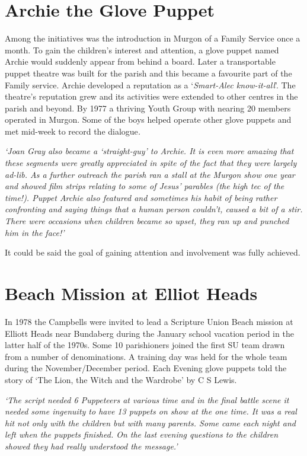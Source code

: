 \hypertarget{archie-the-glove-puppet}{%
\section{Archie the Glove Puppet}\label{archie-the-glove-puppet}}

Among the initiatives was the introduction in Murgon of a Family Service once a month. To gain the children's interest and attention, a glove puppet named Archie would suddenly appear from behind a board. Later a transportable puppet theatre was built for the parish and this became a favourite part of the Family service. Archie developed a reputation as a `\emph{Smart-Alec know-it-all}'. The theatre's reputation grew and its activities were extended to other centres in the parish and beyond. By 1977 a thriving Youth Group with nearing 20 members operated in Murgon. Some of the boys helped operate other glove puppets and met mid-week to record the dialogue\emph{.}

\emph{`Joan Gray also became a `straight-guy' to Archie. It is even more amazing that these segments were greatly appreciated in spite of the fact that they were largely ad-lib. As a further outreach the parish ran a stall at the Murgon show one year and showed film strips relating to some of Jesus' parables (the high tec of the time!). Puppet Archie also featured and sometimes his habit of being rather confronting and saying things that a human person couldn't, caused a bit of a stir. There were occasions when children became so upset, they ran up and punched him in the face!'}

It could be said the goal of gaining attention and involvement was fully achieved.

\hypertarget{beach-mission-at-elliot-heads}{%
\section{Beach Mission at Elliot Heads}\label{beach-mission-at-elliot-heads}}

In 1978 the Campbells were invited to lead a Scripture Union Beach mission at Elliott Heads near Bundaberg during the January school vacation period in the latter half of the 1970s. Some 10 parishioners joined the first SU team drawn from a number of denominations. A training day was held for the whole team during the November/December period. Each Evening glove puppets told the story of `The Lion, the Witch and the Wardrobe' by C S Lewis.

\emph{`The script needed 6 Puppeteers at various time and in the final battle scene it needed some ingenuity to have 13 puppets on show at the one time. It was a real hit not only with the children but with many parents. Some came each night and left when the puppets finished. On the last evening questions to the children showed they had really understood the message.'}

